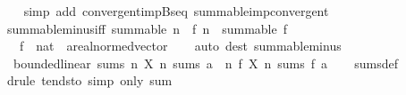 \begin{isabellebody}
%
\isadelimproof
\ \ %
\endisadelimproof
%
\isatagproof
{}\isamarkupfalse%
\ {\isacharparenleft}{\kern0pt}simp\ add{\isacharcolon}{\kern0pt}\ convergent{\isacharunderscore}{\kern0pt}imp{\isacharunderscore}{\kern0pt}Bseq\ summable{\isacharunderscore}{\kern0pt}imp{\isacharunderscore}{\kern0pt}convergent{\isacharparenright}{\kern0pt}%
\endisatagproof
{\isafoldproof}%
%
\isadelimproof
\isanewline
%
\endisadelimproof
\isanewline
{}\isamarkupfalse%
\isanewline
\isanewline
{}\isamarkupfalse%
\ summable{\isacharunderscore}{\kern0pt}minus{\isacharunderscore}{\kern0pt}iff{\isacharcolon}{\kern0pt}\ {\isachardoublequoteopen}summable\ {\isacharparenleft}{\kern0pt}{\isasymlambda}n{\isachardot}{\kern0pt}\ {\isacharminus}{\kern0pt}\ f\ n{\isacharparenright}{\kern0pt}\ {\isasymlongleftrightarrow}\ summable\ f{\isachardoublequoteclose}\isanewline
\ \ \ f\ {\isacharcolon}{\kern0pt}{\isacharcolon}{\kern0pt}\ {\isachardoublequoteopen}nat\ {\isasymRightarrow}\ {\isacharprime}{\kern0pt}a{\isacharcolon}{\kern0pt}{\isacharcolon}{\kern0pt}real{\isacharunderscore}{\kern0pt}normed{\isacharunderscore}{\kern0pt}vector{\isachardoublequoteclose}\isanewline
%
\isadelimproof
\ \ %
\endisadelimproof
%
\isatagproof
{}\isamarkupfalse%
\ {\isacharparenleft}{\kern0pt}auto\ dest{\isacharcolon}{\kern0pt}\ summable{\isacharunderscore}{\kern0pt}minus{\isacharparenright}{\kern0pt}%
\endisatagproof
{\isafoldproof}%
%
\isadelimproof
%
\endisadelimproof
\ \ \isanewline
\isanewline
{}\isamarkupfalse%
\ {\isacharparenleft}{\kern0pt}\ bounded{\isacharunderscore}{\kern0pt}linear{\isacharparenright}{\kern0pt}\ sums{\isacharcolon}{\kern0pt}\ {\isachardoublequoteopen}{\isacharparenleft}{\kern0pt}{\isasymlambda}n{\isachardot}{\kern0pt}\ X\ n{\isacharparenright}{\kern0pt}\ sums\ a\ {\isasymLongrightarrow}\ {\isacharparenleft}{\kern0pt}{\isasymlambda}n{\isachardot}{\kern0pt}\ f\ {\isacharparenleft}{\kern0pt}X\ n{\isacharparenright}{\kern0pt}{\isacharparenright}{\kern0pt}\ sums\ {\isacharparenleft}{\kern0pt}f\ a{\isacharparenright}{\kern0pt}{\isachardoublequoteclose}\isanewline
%
\isadelimproof
\ \ %
\endisadelimproof
%
\isatagproof
{}\isamarkupfalse%
\ sums{\isacharunderscore}{\kern0pt}def\ \isamarkupfalse%
\ {\isacharparenleft}{\kern0pt}drule\ tendsto{\isacharparenright}{\kern0pt}\ {\isacharparenleft}{\kern0pt}simp\ only{\isacharcolon}{\kern0pt}\ sum{\isacharparenright}{\kern0pt}%
\endisatagproof
{\isafoldproof}%
%
\isadelimproof
\isanewline
%
\endisadelimproof
\isanewline

\end{isabellebody}
